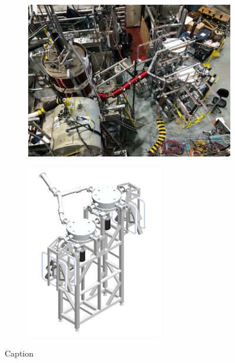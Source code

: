 \begin{figure}
\centering
\begin{subfigure}{.5\textwidth}
  \centering
  \includegraphics[width=\textwidth]{figures/west_beamline_switcher_tests.jpg}
  \vspace{5pt}
  \caption{}\label{subfig:west_beamline_switchers}
\end{subfigure}%
\begin{subfigure}{.5\textwidth}
  \centering
  \includegraphics[height=3in]{figures/switcher_mockup.png}
  \caption{}\label{subfig:switcher_mockup}
\end{subfigure}
\caption
{Caption}
\label{fig:west_beamline_switchers}
\end{figure}


